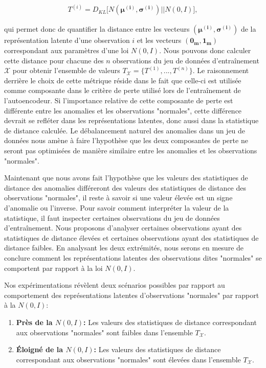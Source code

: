  \begin{gather*}  \label{eq:metrique}
 T^{(i)} = D_{KL}\big[N(\boldsymbol{\mu^{(i)}}, \boldsymbol{\sigma^{(i)}}) || N(0, I)\big],
 \end{gather*}
 
 qui permet donc de quantifier la distance entre les vecteurs $(\boldsymbol{\mu^{(i)}}, \boldsymbol{\sigma^{(i)}})$ de la représentation latente d'une observation $i$ et les vecteurs $(\boldsymbol{0_m}, \boldsymbol{1_m})$ correspondant aux paramètres d'une loi $N(0,I)$. Nous pouvons donc calculer cette distance pour chacune des $n$ observations du jeu de données d'entraînement $\mathcal{X}$ pour obtenir l'ensemble de valeurs $T_{\mathcal{X}}=\{T^{(1)}, ..., T^{(n)}\}$. Le raisonnement derrière le choix de cette métrique réside dans le fait que celle-ci est utilisée comme composante dans le critère de perte utilisé lors de l'entraînement de l'autoencodeur. Si l'importance relative de cette composante de perte est différente entre les anomalies et les observations "normales", cette différence devrait se refléter dans les représentations latentes, donc aussi dans la statistique de distance calculée. Le débalancement naturel des anomalies dans un jeu de données nous amène à faire l'hypothèse que les deux composantes de perte ne seront pas optimisées de manière similaire entre les anomalies et les observations "normales".
 
 Maintenant que nous avons fait l'hypothèse que les valeurs des statistiques de distance des anomalies différeront des valeurs des statistiques de distance des observations "normales", il reste à savoir si une valeur élevée est un signe d'anomalie ou l'inverse. Pour savoir comment interpréter la valeur de la statistique, il faut inspecter certaines observations du jeu de données d'entraînement. Nous proposons d'analyser certaines observations ayant des statistiques de distance élevées et certaines observations ayant des statistiques de distance faibles. En analysant les deux extrémités, nous serons en mesure de conclure comment les représentations latentes des observations dites "normales" se comportent par rapport à la loi $N(0,I)$. 
 
 Nos expérimentations révèlent deux scénarios possibles par rapport au comportement des représentations latentes d'observations "normales" par rapport à la $N(0,I)$:

\begin{enumerate} \label{liste_scenarios}
	\item \textbf{Près de la $N(0,I)$:} Les valeurs des statistiques de distance correspondant aux observations "normales" sont faibles dans l'ensemble $T_{\mathcal{X}}$.
	\item \textbf{Éloigné de la $N(0,I)$:} Les valeurs des statistiques de distance correspondant aux observations "normales" sont élevées dans l'ensemble $T_{\mathcal{X}}$.
\end{enumerate}


